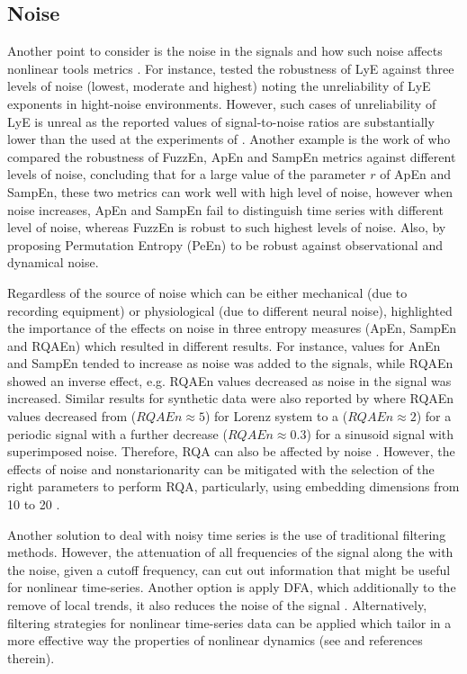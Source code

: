 \subsection{Noise}
Another point to consider is the noise in the signals
and how such noise affects nonlinear tools metrics \citep{caballero2014}.
For instance, \cite{rosenstein1993} tested the robustness of LyE against 
three levels of noise (lowest, moderate and highest) noting the unreliability 
of LyE exponents in hight-noise environments.
However, such cases of unreliability of LyE is unreal as the reported 
values of signal-to-noise ratios are substantially lower than the used at 
the experiments of \cite{rosenstein1993}.
Another example is the work of \cite{chen2009} who compared the 
robustness of FuzzEn, ApEn and SampEn metrics against different levels of noise, 
concluding that for a large value of the parameter $r$ of ApEn and SampEn, 
these two metrics can work well with high level of noise, however
when noise increases, ApEn and SampEn fail to distinguish time series with 
different level of noise, whereas FuzzEn is robust to such highest 
levels of noise.
Also, \cite{bandt2002} by proposing Permutation Entropy (PeEn) to be
robust against observational and dynamical noise.

Regardless of the source of noise which can be either mechanical 
(due to recording equipment) or physiological (due to different neural noise), 
\cite{rhea2011} highlighted the importance of the effects on noise in three 
entropy measures (ApEn, SampEn and RQAEn) which resulted in different results.
For instance, values for AnEn and SampEn tended to increase as noise was 
added to the signals, while RQAEn  showed an inverse effect, e.g. RQAEn 
values decreased as noise in the signal was increased.
Similar results for synthetic data were also reported by \cite{pellecchia2005} 
where RQAEn values decreased from ($RQAEn \approx 5$) for Lorenz system to a 
($RQAEn \approx 2$) for a periodic signal with a further decrease 
($RQAEn \approx 0.3$) for a sinusoid signal with superimposed noise. 
Therefore, RQA can also be affected by noise \citep{rhea2011}.
However, the effects of noise and nonstarionarity
can be mitigated with the selection of the right parameters to perform RQA,
particularly, using embedding dimensions from 10 to 20 
\citep{webber2005}.

Another solution to deal with noisy time series is the use of 
traditional filtering methods. However, the attenuation of all frequencies 
of the signal along the with the noise, given a cutoff frequency, can cut 
out information that might be useful for nonlinear time-series. 
Another option is apply DFA, which additionally to the remove of local 
trends, it also reduces the noise of the signal \citep{hausdorff1995}.
Alternatively, filtering strategies for nonlinear time-series data can 
be applied which tailor in a more effective way the properties of 
nonlinear dynamics (see \citealt*{bradley2015} and references therein).




